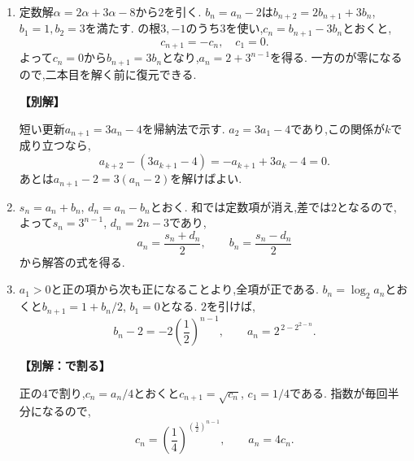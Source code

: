 \begin{enumerate}[label=\textbf{問\arabic*.},leftmargin=3.8em,format=\bookitemlink{practice-basic}{solution}{problem}]
          \item 定数解$\alpha=2\alpha+3\alpha-8$から$2$を引く.
                  $b_n=a_n-2$は$b_{n+2}=2b_{n+1}+3b_n$, $b_1=1,b_2=3$を満たす.
                  の根$3,-1$のうち$3$を使い,$c_n=b_{n+1}-3b_n$とおくと,
                  \[
                    c_{n+1}=-c_n,\quad c_1=0.
                  \]
                  よって$c_n=0$から$b_{n+1}=3b_n$となり,$a_n=2+3^{n-1}$を得る.
                  一方のが零になるので,二本目を解く前に復元できる.
                  \par\smallskip\noindent\textbf{【別解】}\par
                  短い更新$a_{n+1}=3a_n-4$を帰納法で示す.
                  $a_2=3a_1-4$であり,この関係が$k$で成り立つなら,
                  \[
                    a_{k+2}-(3a_{k+1}-4)=-a_{k+1}+3a_k-4=0.
                  \]
                  あとは$a_{n+1}-2=3(a_n-2)$を解けばよい.

          \item $s_n=a_n+b_n$, $d_n=a_n-b_n$とおく.
                  和では定数項が消え,差では$2$となるので,
                  \BookMathLayout{\[
                    s_{n+1}=3s_n,\quad d_{n+1}=d_n+2,
                    \quad s_1=1,\ d_1=-1.
                  \]}{\[
                  \begin{aligned}
                    s_{n+1}&=3s_n,\quad d_{n+1}=d_n+2,\\
                    s_1&=1,\quad d_1=-1.
                  \end{aligned}
                  \]}
                  よって$s_n=3^{n-1}$, $d_n=2n-3$であり,
                  \[
                    a_n=\frac{s_n+d_n}2,\qquad b_n=\frac{s_n-d_n}2
                  \]
                  から解答の式を得る.

          \item $a_1>0$と正の項から次も正になることより,全項が正である.
                  $b_n=\log_2a_n$とおくと$b_{n+1}=1+b_n/2$, $b_1=0$となる.
                  $2$を引けば,
                  \[
                    b_n-2=-2\left(\frac12\right)^{n-1},
                    \qquad a_n=2^{\,2-2^{2-n}}.
                  \]
                  \par\smallskip\noindent\textbf{【別解：で割る】}\par
                  正の$4$で割り,$c_n=a_n/4$とおくと$c_{n+1}=\sqrt{c_n}$, $c_1=1/4$である.
                  指数が毎回半分になるので,
                  \[
                    c_n=\left(\frac14\right)^{(\frac12)^{n-1}},
                    \qquad a_n=4c_n.
                  \]


\end{enumerate}
